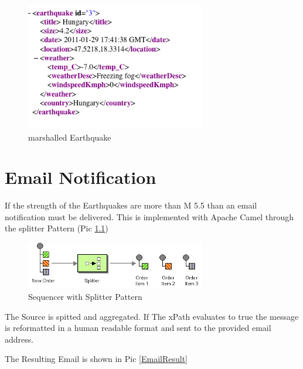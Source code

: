 \documentclass[11pt,english,ngerman, headsepline]{scrreprt}
\begin{document}
   
   \begin{figure}[h!]
	\begin{center}
	\includegraphics[width=0.7\textwidth]{pics/marshalledEarthquake}
	\end{center}
	\caption{marshalled Earthquake}
	\label{picmarshalledEarthquake.png} 
   \end{figure}



\chapter{Email Notification}

If the strength of the Earthquakes are more than M 5.5 than an email
notification must be delivered. This is implemented with Apache Camel through
the splitter Pattern (Pic \ref{splitter}) 


 \begin{figure}[h!]
	\begin{center}
	\includegraphics[width=0.7\textwidth]{pics/Sequencer.jpg}
	\end{center}
	\caption{Sequencer with Splitter Pattern}
	\label{splitter} 
   \end{figure}


The Source is spitted and aggregated. If The xPath evaluates to true the
message is reformatted in a human readable format and sent to the provided email
address.




The Resulting Email is shown in Pic \ref{EmailResult}
\end{document}
